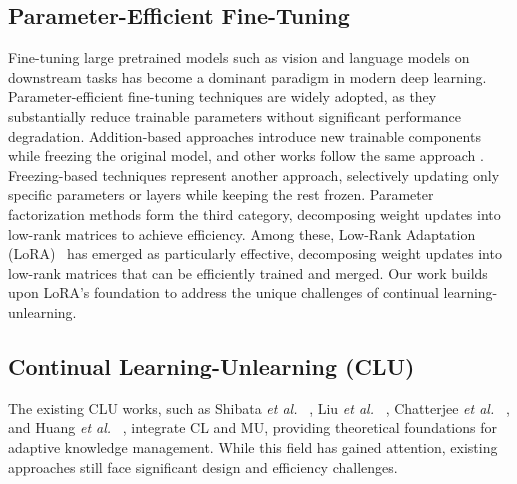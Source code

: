 \subsection{Parameter-Efficient Fine-Tuning}
\label{2.3}
Fine-tuning large pretrained models such as vision and language models on downstream tasks has become a dominant paradigm in modern deep learning. Parameter-efficient fine-tuning techniques are widely adopted, as they substantially reduce trainable parameters without significant performance degradation. Addition-based approaches \cite{liu2024gpt} introduce new trainable components while freezing the original model, and other works follow the same approach \cite{houlsby2019parameter,li2021prefix}. Freezing-based techniques \cite{lee2019would} represent another approach, selectively updating only specific parameters or layers while keeping the rest frozen. Parameter factorization methods \cite{chavan2023one,valipour2022dylora} form the third category, decomposing weight updates into low-rank matrices to achieve efficiency. Among these, Low-Rank Adaptation (LoRA)~\cite{hu2022lora} has emerged as particularly effective, decomposing weight updates into low-rank matrices that can be efficiently trained and merged. Our work builds upon LoRA's foundation to address the unique challenges of continual learning-unlearning.

\subsection{Continual Learning-Unlearning (CLU)}
\label{2.4}
The existing CLU works, such as Shibata \textit{et al.} ~\cite{shibata2021learning}, Liu \textit{et al.}  ~\cite{liu2022continual}, Chatterjee \textit{et al.} ~\cite{chatterjee2024unified}, and Huang \textit{et al.} ~\cite{huang2025unified}, integrate CL and MU, providing theoretical foundations for adaptive knowledge management. While this field has gained attention, existing approaches still face significant design and efficiency challenges.  

